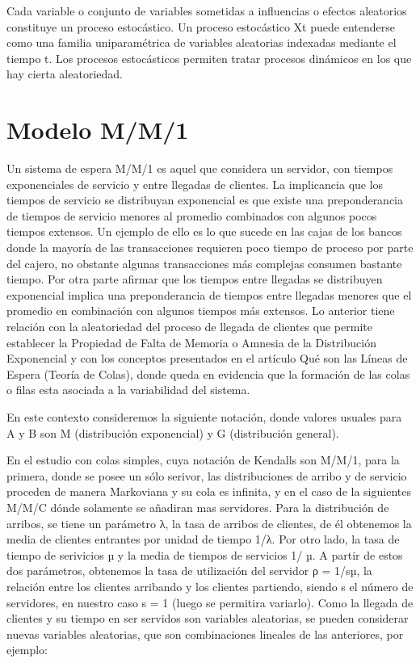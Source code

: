 Cada variable o conjunto de variables sometidas a influencias o efectos aleatorios constituye un proceso estocástico.
Un proceso estocástico Xt puede entenderse como una familia uniparamétrica de
variables aleatorias indexadas mediante el tiempo t.
Los procesos estocásticos permiten tratar procesos dinámicos en los que hay cierta aleatoriedad.


\section{Modelo M/M/1}\label{sec:modelo-m/m/1}
Un sistema de espera M/M/1 es aquel que considera un servidor, con tiempos exponenciales de servicio y entre llegadas
de clientes. La implicancia que los tiempos de servicio se distribuyan exponencial es que existe una preponderancia de
tiempos de servicio menores al promedio combinados con algunos pocos tiempos extensos. Un ejemplo de ello es lo que
sucede en las cajas de los bancos donde la mayoría de las transacciones requieren poco tiempo de proceso por parte del
cajero, no obstante algunas transacciones más complejas consumen bastante tiempo. Por otra parte afirmar que los tiempos
entre llegadas se distribuyen exponencial implica una preponderancia de tiempos entre llegadas menores que el promedio
en combinación con algunos tiempos más extensos. Lo anterior tiene relación con la aleatoriedad del proceso de llegada
de clientes que permite establecer la Propiedad de Falta de Memoria o Amnesia de la Distribución Exponencial y
con los conceptos presentados en el artículo Qué son las Líneas de Espera (Teoría de Colas), donde queda en evidencia
que la formación de las colas o filas esta asociada a la variabilidad del sistema.

En este contexto consideremos la siguiente notación, donde valores usuales para A y B son M (distribución exponencial)
y G (distribución general).

En el estudio con colas simples, cuya notación de Kendalls son M/M/1, para la primera, donde se posee un sólo serivor,
las distribuciones de arribo y de servicio proceden de manera Markoviana y su cola es infinita, y en el caso de la
siguientes M/M/C dónde solamente se añadiran mas servidores.
Para la distribución de arribos, se tiene un parámetro λ, la tasa de arribos de clientes, de él obtenemos la media de
clientes entrantes por unidad de tiempo 1/λ.
Por otro lado, la tasa de tiempo de serivicios µ y la media de tiempos de servicios 1/ µ.
A partir de estos dos parámetros, obtenemos la tasa de utilización del servidor ρ = 1/sµ, la relación entre los clientes
arribando y los clientes partiendo, siendo s el número de servidores, en nuestro caso s = 1 (luego se permitira variarlo).
Como la llegada de clientes y su tiempo en ser servidos son variables aleatorias, se pueden considerar
nuevas variables aleatorias, que son combinaciones lineales de las anteriores, por ejemplo:

